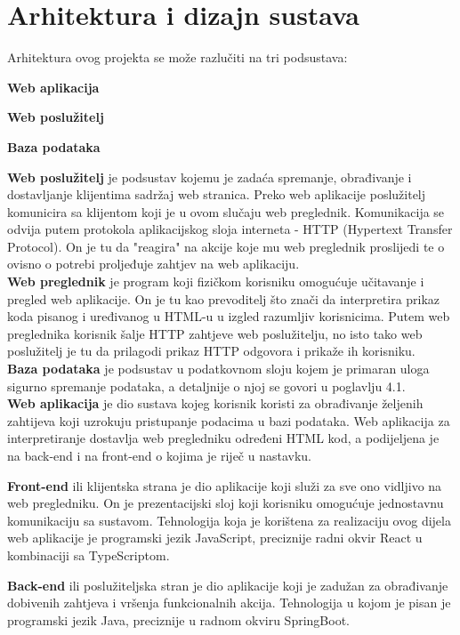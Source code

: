 \chapter{Arhitektura i dizajn sustava}
		
	
	Arhitektura ovog projekta se može razlučiti na tri podsustava:
	\begin{packed_item}
	\setlength\itemindent{24pt}
		\item\textbf{Web aplikacija}
		\item\textbf{Web poslužitelj}
		\item\textbf{Baza podataka}
	\end{packed_item}
	
	\textbf{Web poslužitelj} je podsustav kojemu je zadaća spremanje, obrađivanje i dostavljanje klijentima sadržaj web stranica. Preko web aplikacije poslužitelj komunicira sa klijentom koji je u ovom slučaju web preglednik. Komunikacija se odvija putem protokola aplikacijskog sloja interneta - HTTP (Hypertext Transfer Protocol). On je tu da "reagira" na akcije koje mu web preglednik proslijedi te o ovisno o potrebi proljeđuje zahtjev na web aplikaciju.\\
	
	\textbf{Web preglednik} je program koji fizičkom korisniku omogućuje učitavanje i pregled web aplikacije. On je tu kao prevoditelj što znači da interpretira prikaz koda pisanog i uređivanog u HTML-u u izgled razumljiv
korisnicima. Putem web preglednika korisnik šalje HTTP zahtjeve web poslužitelju, no isto tako web poslužitelj je tu da prilagodi prikaz HTTP odgovora i prikaže ih korisniku.\\

	\textbf{Baza podataka} je podsustav u podatkovnom sloju kojem je primaran uloga sigurno spremanje podataka, a detaljnije o njoj se govori u poglavlju 4.1.\\
	
	\textbf{Web aplikacija} je dio sustava kojeg korisnik koristi za obrađivanje željenih zahtijeva koji uzrokuju pristupanje podacima u bazi podataka. Web aplikacija za interpretiranje dostavlja web pregledniku određeni HTML kod, a podijeljena je na back-end i na front-end o kojima je riječ u nastavku.
	\begin{packed_item}
	\item\textbf{Front-end} ili klijentska strana je dio aplikacije koji služi za sve ono vidljivo na web pregledniku. On je prezentacijski sloj koji korisniku omogućuje jednostavnu komunikaciju sa sustavom. Tehnologija koja je korištena za realizaciju ovog dijela web aplikacije je programski jezik JavaScript, preciznije radni okvir React u kombinaciji sa TypeScriptom.
	\item\textbf{Back-end} ili poslužiteljska stran je dio aplikacije koji je zadužan za obrađivanje dobivenih zahtjeva i vršenja funkcionalnih akcija. Tehnologija u kojom je pisan je programski jezik Java, preciznije u radnom okviru SpringBoot.\\
	\end{packed_item}

